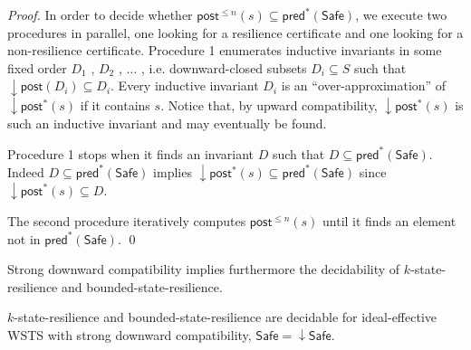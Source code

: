 \documentclass[runningheads]{llncs}
\newcommand{\pred}{\textsf{pred}}
\newcommand{\post}{\textsf{post}}
\newcommand{\Bad}{\textsf{Bad}}
\newcommand{\Safe}{\textsf{Safe}}
\begin{document}
\begin{proof}
In order to decide whether $\post^{\leq n}(s) %
 \subseteq \pred^*(\Safe)$, we execute two procedures in parallel,
one looking for a resilience certificate and one looking for a non-resilience certificate.
Procedure 1 enumerates inductive invariants in some fixed order $D_1$ , $D_2$ , $\ldots$ , i.e. downward-closed subsets $D_i \subseteq S$ such that $\downarrow \post(D_i ) \subseteq D_i$. 
Every inductive invariant $D_i$ is an “over-approximation” of $\downarrow \post^*(s)$ if it contains $s$.
Notice that, by 
upward compatibility, $\downarrow \post^*(s)$ is such an inductive invariant and may eventually be found.

Procedure 1 stops when it finds an invariant $D$ such that
$D  %
 \subseteq \pred^*(\Safe)$. 
Indeed
$D %
\subseteq  \pred^*(\Safe)$ implies
$\downarrow \post^*(s) %
 \subseteq  \pred^*(\Safe)$
since $ \downarrow \post^*(s)  \subseteq D$.

The second procedure iteratively computes
$\post^{\leq n}(s) %
$
until it finds an element
not in $\pred^*(\Safe)$. \qed
\end{proof}



Strong downward compatibility implies furthermore the decidability
of {\sc $k$-state-resilience} and {\sc bounded-state-resilience}.

\begin{corollary}\label{downward brp}
{\sc $k$-state-resilience} and {\sc bounded-state-resilience} are decidable for ideal-effective WSTS with strong downward compatibility,
$\Safe = \downarrow \Safe$.
\end{corollary}









 	







\appendix




\end{document}
